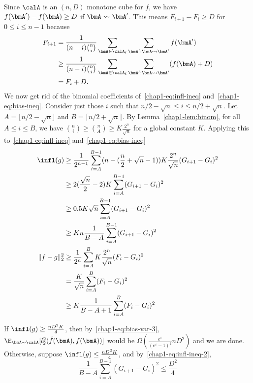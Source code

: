 Since $\calA$ is an $(n, D)$ monotone cube for $f$, we have
$f(\bmA') - f(\bmA) \geq D$ if $\bmA \leadsto \bmA'$. 
This means $F_{i+1}-F_i \geq D$ for $0 \leq i \leq n-1$ 
because 
\begin{align*}
F_{i+1} 
&= \frac{1}{(n-i)\binom{n}{i}} \sum_{\bmA \in \calA_i} \sum_{\bmA': \bmA \leadsto \bmA'} f(\bmA') \\
&\geq \frac{1}{(n-i)\binom{n}{i}} \sum_{\bmA \in \calA_i} \sum_{\bmA': \bmA \leadsto \bmA'} (f(\bmA)+D) \\
&= F_i+D.
\end{align*}
We now get rid of the binomial coefficients of~\eqref{chap1-eq:infl-ineq} and~\eqref{chap1-eq:bias-ineq}. Consider just those $i$ such that $n/2 - \sqrt{n} \leq i \leq n/2 + \sqrt{n}$. Let $A = \lfloor n/2-\sqrt{n}\rfloor$ and $B = \lceil n/2+\sqrt{n} \rceil$.
By Lemma~\ref{chap1-lem:binom}, for all $A \leq i \leq B$, we have $\binom{n}{i} \geq
\binom{n}{A} \geq K\frac{2^n}{\sqrt{n}}$ for a global constant $K$. Applying
this to~\eqref{chap1-eq:infl-ineq} and~\eqref{chap1-eq:bias-ineq}
\begin{align}
    \infl(g) &\geq \frac{1}{2^{n-1}} \sum_{i=A}^{B-1} 
    (n - (\frac{n}{2} + \sqrt{n} - 1))
    K \frac{2^n}{\sqrt{n}} (G_{i+1} - G_{i})^2 \nonumber \\ 
    &\geq 2 
    (\frac{\sqrt{n}}{2} - 2)
    K \sum_{i=A}^{B-1} (G_{i+1} - G_i)^2 \nonumber \\
    &\geq 0.5 K \sqrt{n} \sum_{i=A}^{B-1} (G_{i+1} - G_i)^2 \nonumber \\
    &\geq K n \frac{1}{B-A} \sum_{i=A}^{B-1} (G_{i+1} - G_i)^2
    \label{chap1-eq:infl-ineq-2} \\
    \|f - g\|_2^2 &\geq \frac{1}{2^n} \sum_{i=A}^{B} K \frac{2^n}{\sqrt{n}} (F_i
    - G_i)^2 \nonumber \\
    &= \frac{K}{\sqrt{n}} \sum_{i=A}^{B} (F_i - G_i)^2 \nonumber \\
    &\geq K \frac{1}{B-A+1} \sum_{i=A}^{B} (F_i - G_i)^2 \label{chap1-eq:bias-ineq-2}
\end{align}

If $\infl(g) \geq \frac{nD^2K}{4}$, then by~\eqref{chap1-eq:bias-var-3}, $\E_{\bmA
\sim \calA}[l_2^2(\hat{f}(\bmA),f(\bmA))]$ would be
$\Omega(\frac{e^\varepsilon}{(e^\varepsilon-1)^2}nD^2)$ and we are done.
Otherwise, suppose $\infl(g) \leq \frac{nD^2K}{4}$, and
by~\eqref{chap1-eq:infl-ineq-2},
\[
    \frac{1}{B-A} \sum_{i=A}^{B-1} (G_{i+1} - G_i)^2 \leq \frac{D^2}{4}
\]

